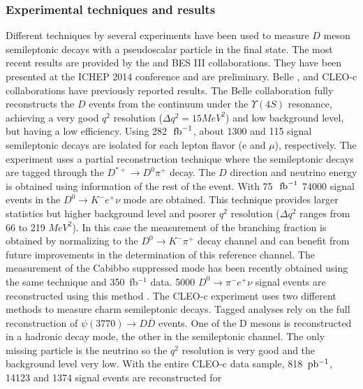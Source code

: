 \subsubsection{Experimental techniques and results}
 Different techniques by several experiments have been used to measure $D$ meson semileptonic decays with a 
pseudoscalar particle in the final state. The most recent results are provided by the \babar and BES III collaborations.
They have been presented at the ICHEP 2014 conference and are preliminary.  
Belle \cite{Widhalm:2006wz}, \babar \cite{Aubert:2007wg} and CLEO-c \cite{Besson:2009uv,Dobbs:2007aa} 
collaborations have previously reported results. 
The Belle collaboration fully reconstructs the $D$ events from the continuum under the $\Upsilon(4S)$ resonance, 
achieving a very good $q^2$ resolution ($\Delta q^2 = 15 MeV^2$) and low background level, 
but having a low efficiency. Using 282~$\mbox{\,fb}^{-1}$, about 1300 and 115 signal semileptonic decays are 
isolated for each lepton flavor (e and $\mu$), respectively. 
The \babar experiment uses a partial reconstruction technique where the semileptonic decays are tagged 
through the $ D^{\ast +}\to D^0\pi^+$ decay. 
The $D$ direction and neutrino energy is obtained using information of the rest of the event. 
With 75~$\mbox{\,fb}^{-1}$ 74000 signal events in the $D^0 \to {K}^- e^+ \nu$ mode are obtained. 
This technique provides larger statistics but higher background level and poorer $q^2$ resolution ($\Delta q^2$ ranges from 66 to 219 $MeV^2$). In this case the measurement of the branching fraction is obtained by normalizing to the $D^0 \to K^- \pi^+$ decay channel and can benefit from future improvements in the determination of this reference channel. The measurement of the Cabibbo suppressed mode has been recently obtained 
using the same technique and 350~fb$^{-1}$ data. 5000 $D^0 \to {\pi}^- e^+ \nu$ signal events are reconstructed using this method \cite{babar-new}.  
The CLEO-c experiment uses two different methods to measure charm semileptonic decays. 
Tagged analyses \cite{Besson:2009uv} rely on the full reconstruction of $\psi(3770)\to D {\overline D}$ events. One of the D mesons is reconstructed in a hadronic decay mode, the other in the semileptonic channel. The only missing particle is the neutrino so the $q^2$ resolution is very good and the background level very low.   
With the entire CLEO-c data sample, 818 $\rm \,pb^{-1}$, 14123 and 1374 signal events are reconstructed for 

